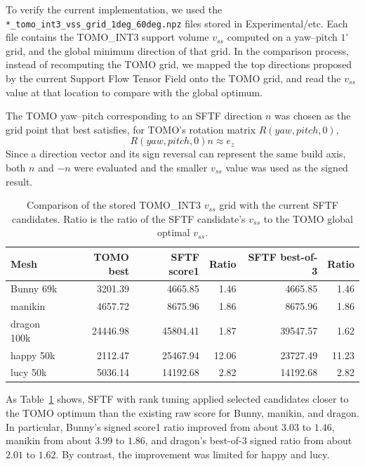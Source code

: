 \documentclass[11pt,a4paper]{article}
\begin{document}
To verify the current implementation, we used the
\texttt{*\_tomo\_int3\_vss\_grid\_1deg\_60deg.npz} files stored in Experimental/etc.
Each file contains the TOMO\_INT3 support volume $v_{ss}$ computed on a yaw--pitch $1^\circ$ grid,
and the global minimum direction of that grid.
In the comparison process, instead of recomputing the TOMO grid,
we mapped the top directions proposed by the current Support Flow Tensor Field onto the TOMO grid,
and read the $v_{ss}$ value at that location to compare with the global optimum.

The TOMO yaw--pitch corresponding to an SFTF direction $n$ was chosen as the grid point that best satisfies,
for TOMO's rotation matrix $R(yaw,pitch,0)$,
\begin{equation}
R(yaw,pitch,0)n \approx e_z
\end{equation}
Since a direction vector and its sign reversal can represent the same build axis,
both $n$ and $-n$ were evaluated and the smaller $v_{ss}$ value was used as the signed result.

\begin{table}[H]
\centering
\caption{Comparison of the stored TOMO\_INT3 $v_{ss}$ grid with the current SFTF candidates.
Ratio is the ratio of the SFTF candidate's $v_{ss}$ to the TOMO global optimal $v_{ss}$.}
\label{tab:sftf-tomo-comparison}
\begin{tabular}{lrrrrr}
\toprule
Mesh & TOMO best & SFTF score1 & Ratio & SFTF best-of-3 & Ratio\\
\midrule
Bunny 69k & 3201.39 & 4665.85 & 1.46 & 4665.85 & 1.46\\
manikin & 4657.72 & 8675.96 & 1.86 & 8675.96 & 1.86\\
dragon 100k & 24446.98 & 45804.41 & 1.87 & 39547.57 & 1.62\\
happy 50k & 2112.47 & 25467.94 & 12.06 & 23727.49 & 11.23\\
lucy 50k & 5036.14 & 14192.68 & 2.82 & 14192.68 & 2.82\\
\bottomrule
\end{tabular}
\end{table}

As Table~\ref{tab:sftf-tomo-comparison} shows,
SFTF with rank tuning applied selected candidates closer to the TOMO optimum than the existing raw score for Bunny, manikin, and dragon.
In particular, Bunny's signed score1 ratio improved from about $3.03$ to $1.46$,
manikin from about $3.99$ to $1.86$,
and dragon's best-of-3 signed ratio from about $2.01$ to $1.62$.
By contrast, the improvement was limited for happy and lucy.
\end{document}
